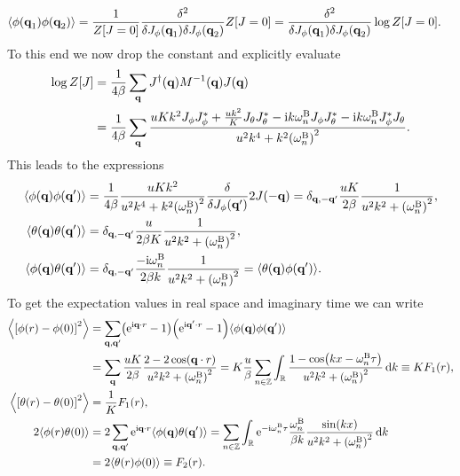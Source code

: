\documentclass[english, parskip=full]{scrartcl}
\begin{document}
\begin{align}
\bra*{\phi(\textbf{q}_1) \phi(\textbf{q}_2)} &= \frac{1}{Z[J=0]} \frac{\delta^2}{\delta J_\phi(\textbf{q}_1) \delta J_\phi(\textbf{q}_2)} Z[J=0] = \frac{\delta^2}{\delta J_\phi(\textbf{q}_1) \delta J_\phi(\textbf{q}_2)} \log Z[J=0].
\end{align}
To this end we now drop the constant and explicitly evaluate
\begin{align}
\log Z[J] &= \frac{1}{4\beta} \sum_\textbf{q} J^\dagger(\textbf{q}) M^{-1}(\textbf{q}) J(\textbf{q}) \\
&= \frac{1}{4\beta} \sum_\textbf{q} \frac{uKk^2 J_\phi J_\phi^\ast + \frac{uk^2}{K} J_\theta J_\theta^\ast - \i k\omega_n^\B J_\phi J_\theta^\ast - \i k\omega_n^\B J_\phi^\ast J_\theta}{u^2k^4 + k^2\kla*{\omega_n^\B}^2} .
\end{align}
This leads to the expressions
\begin{align}
\bra*{\phi(\textbf{q}) \phi(\textbf{q}')} &= \frac{1}{4\beta} \frac{uKk^2}{u^2k^4 + k^2 \kla*{\omega_n^\B}^2} \frac{\delta }{\delta J_\phi(\textbf{q}')} 2J(-\textbf{q}) = \delta_{\textbf{q},-\textbf{q}'} \frac{uK}{2\beta} \frac{1}{u^2k^2 + \kla*{\omega_n^\B}^2},\\
\bra*{\theta(\textbf{q}) \theta(\textbf{q}')} &= \delta_{\textbf{q},-\textbf{q}'} \frac{u}{2\beta K} \frac{1}{u^2k^2 + \kla*{\omega_n^\B}^2},\\
\bra*{\phi(\textbf{q}) \theta(\textbf{q}')} &= \delta_{\textbf{q},-\textbf{q}'} \frac{-\i\omega_n^\B}{2\beta k} \frac{1}{u^2k^2 + \kla*{\omega_n^\B}^2} = \bra*{\theta(\textbf{q}) \phi(\textbf{q}')}.
\end{align}
To get the expectation values in real space and imaginary time we can write
\begin{align}
\bra*{\klb*{\phi(r) - \phi(0)}^2} &= \sum_{\textbf{q},\textbf{q}'} \kla*{\powe{\i \textbf{q}\cdot r} - 1} \kla*{\powe{\i \textbf{q}'\cdot r} - 1} \bra*{\phi(\textbf{q}) \phi(\textbf{q}')} \\
&=\sum_\textbf{q} \frac{uK}{2\beta} \frac{2 - 2\cos\kla*{\textbf{q}\cdot r}}{u^2k^2 + \kla*{\omega_n^\B}^2} = K \frac{u}{\beta} \sum_{n\in\mathbb{Z}} \intr{\frac{1 - \cos\kla*{kx - \omega_n^\B \tau}}{u^2k^2 + \kla*{\omega_n^\B}^2}}{k} \equiv KF_1(r),\\
\bra*{\klb*{\theta(r) - \theta(0)}^2} &= \frac{1}{K} F_1(r),\\
2\bra*{\phi(r)\theta(0)} &= 2\sum_{\textbf{q},\textbf{q}'} \powe{\i \textbf{q}\cdot r} \bra*{\phi(\textbf{q})\theta(\textbf{q}')} = \sum_{n\in\mathbb{Z}} \intr{ \powe{-\i\omega_n^\B\tau} \frac{\omega_n^\B}{\beta k} \frac{\sin(kx)}{u^2k^2 + \kla*{\omega_n^\B}^2}}{k} \\
&= 2\bra*{\theta(r) \phi(0)} \equiv F_2(r).
\end{align}
\end{document}
